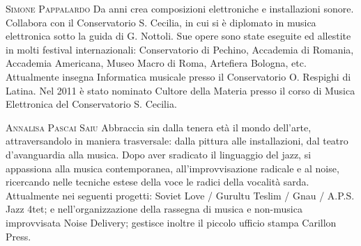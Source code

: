 \documentclass[9pt, twoside, a5paper]{extreport}
\newcommand{\biografia}[2]{%
\noindent \textsc{#1} %
#2 %
\medskip
}%
\begin{document}
\begin{multicols}{2}

\biografia{Simone Pappalardo}{Da anni crea composizioni elettroniche e installazioni sonore. Collabora con il Conservatorio S. Cecilia, in cui si è diplomato in musica elettronica sotto la guida di G. Nottoli. Sue opere sono state eseguite ed allestite in molti festival internazionali: Conservatorio di Pechino, Accademia di Romania, Accademia Americana, Museo Macro di Roma, Artefiera Bologna, etc. Attualmente insegna Informatica musicale presso il Conservatorio O. Respighi di Latina. Nel 2011 è stato nominato Cultore della Materia presso il corso di Musica Elettronica del Conservatorio S. Cecilia.}

\biografia{Annalisa Pascai Saiu}{Abbraccia sin dalla tenera età il mondo dell'arte, attraversandolo in maniera trasversale: dalla pittura alle installazioni, dal teatro d'avanguardia alla musica. Dopo aver sradicato il linguaggio del jazz, si appassiona alla musica contemporanea, all'improvvisazione radicale e al noise, ricercando nelle tecniche estese della voce le radici della vocalità sarda.
Attualmente nei seguenti progetti: Soviet Love / Gurultu Teslim / Gnau / A.P.S. Jazz 4tet; e nell'organizzazione della rassegna di musica e non-musica improvvisata Noise Delivery; gestisce inoltre il piccolo ufficio stampa Carillon Press.}


\end{multicols}
\end{document}
